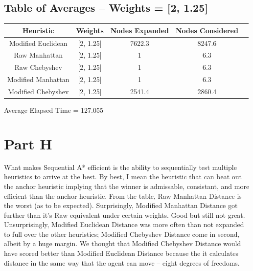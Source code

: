 \documentclass[12pt]{article}
\begin{document}
\subsection{Table of Averages -- Weights = [2, 1.25]}
\begin{tabular}{|c|c|c|c|c|}
\hline
	Heuristic & Weights & Nodes Expanded & Nodes Considered\\
\hline
	Modified Euclidean & [2, 1.25] & 7622.3 & 8247.6\\
\hline
	Raw Manhattan & [2, 1.25] & 1 & 6.3\\
\hline
	Raw Chebyshev & [2, 1.25] & 1 & 6.3\\
\hline
	Modified Manhattan & [2, 1.25] & 1 & 6.3\\
\hline
	Modified Chebyshev & [2, 1.25] & 2541.4 & 2860.4\\
\hline
\end{tabular}
\newline
Average Elapsed Time = 127.055

\section{Part H}
What makes Sequential A* efficient is the ability to sequentially test multiple heuristics to arrive at the best. By best, I mean the heuristic that can beat out the anchor heuristic implying that the winner is admissable, consistant, and more efficient than the anchor heuristic.
\newline
\newline
From the table, Raw Manhattan Distance is the worst (as to be expected). Surprisingly, Modified Manhattan Distance got further than it's Raw equivalent under certain weights. Good but still not great. Unsurprisingly, Modified Euclidean Distance was more often than not expanded to full over the other heuristics; Modified Chebyshev Distance come in second, albeit by a huge margin. We thought that Modified Chebyshev Distance would have scored better than Modified Euclidean Distance because the it calculates distance in the same way that the agent can move -- eight degrees of freedoms.
\newline
\newline
\end{document}
